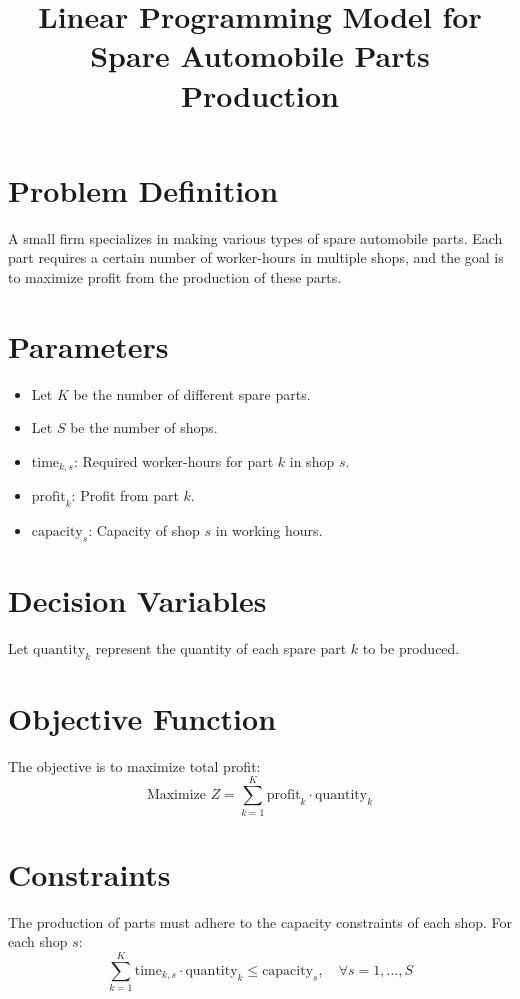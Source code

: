 \documentclass{article}
\begin{document}
\title{Linear Programming Model for Spare Automobile Parts Production}
\author{}
\date{}
\maketitle

\section*{Problem Definition}
A small firm specializes in making various types of spare automobile parts. Each part requires a certain number of worker-hours in multiple shops, and the goal is to maximize profit from the production of these parts.

\section*{Parameters}
\begin{itemize}
    \item Let \( K \) be the number of different spare parts.
    \item Let \( S \) be the number of shops.
    \item \( \text{time}_{k,s} \): Required worker-hours for part \( k \) in shop \( s \).
    \item \( \text{profit}_{k} \): Profit from part \( k \).
    \item \( \text{capacity}_{s} \): Capacity of shop \( s \) in working hours.
\end{itemize}

\section*{Decision Variables}
Let \( \text{quantity}_{k} \) represent the quantity of each spare part \( k \) to be produced.

\section*{Objective Function}
The objective is to maximize total profit:
\[
\text{Maximize } Z = \sum_{k=1}^{K} \text{profit}_{k} \cdot \text{quantity}_{k}
\]

\section*{Constraints}
The production of parts must adhere to the capacity constraints of each shop. For each shop \( s \):
\[
\sum_{k=1}^{K} \text{time}_{k,s} \cdot \text{quantity}_{k} \leq \text{capacity}_{s}, \quad \forall s = 1, \ldots, S
\]
\end{document}
